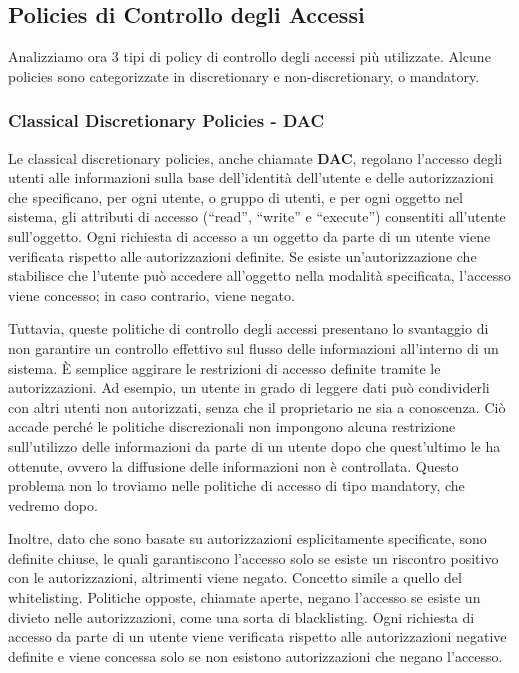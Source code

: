    \subsection{Policies di Controllo degli Accessi}
        Analizziamo ora 3 tipi di policy di controllo degli accessi più utilizzate. Alcune policies sono categorizzate in discretionary e non-discretionary, o mandatory.

        \subsubsection{Classical Discretionary Policies - DAC}
            Le classical discretionary policies, anche chiamate \textbf{DAC}, regolano l'accesso degli utenti alle informazioni sulla base dell'identità dell'utente e delle autorizzazioni che specificano, per ogni utente, o gruppo di utenti, e per ogni oggetto nel sistema, gli attributi di accesso (“read”, “write” e “execute”) consentiti all'utente sull'oggetto. Ogni richiesta di accesso a un oggetto da parte di un utente viene verificata rispetto alle autorizzazioni definite. Se esiste un'autorizzazione che stabilisce che l'utente può accedere all'oggetto nella modalità specificata, l'accesso viene concesso; in caso contrario, viene negato.

            Tuttavia, queste politiche di controllo degli accessi presentano lo svantaggio di non garantire un controllo effettivo sul flusso delle informazioni all'interno di un sistema. È semplice aggirare le restrizioni di accesso definite tramite le autorizzazioni. Ad esempio, un utente in grado di leggere dati può condividerli con altri utenti non autorizzati, senza che il proprietario ne sia a conoscenza. Ciò accade perché le politiche discrezionali non impongono alcuna restrizione sull'utilizzo delle informazioni da parte di un utente dopo che quest'ultimo le ha ottenute, ovvero la diffusione delle informazioni non è controllata. Questo problema non lo troviamo nelle politiche di accesso di tipo mandatory, che vedremo dopo.

            Inoltre, dato che sono basate su autorizzazioni esplicitamente specificate, sono definite chiuse, le quali garantiscono l'accesso solo se esiste un riscontro positivo con le autorizzazioni, altrimenti viene negato. Concetto simile a quello del whitelisting. Politiche opposte, chiamate aperte, negano l'accesso se esiste un divieto nelle autorizzazioni, come una sorta di blacklisting. Ogni richiesta di accesso da parte di un utente viene verificata rispetto alle autorizzazioni negative definite e viene concessa solo se non esistono autorizzazioni che negano l'accesso.

